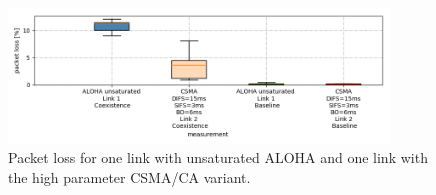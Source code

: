 \begin{figure}[tb]
	\label{fig:results-unsat-aloha-csma-packet-loss}
	\begin{center}
		\includegraphics[width=0.9\textwidth]{pictures/results/different_combinations/aloha_unsat_csma/packet_loss_boxplot}	
	\end{center}
	\caption{Packet loss for one link with unsaturated ALOHA and one link with the high parameter CSMA/CA variant.}
\end{figure}

